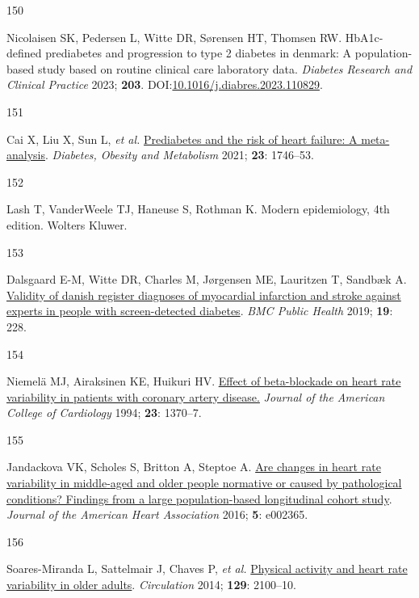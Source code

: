 \documentclass[
  a4paper,
  headsepline=true,
  open=left]{scrbook}
\newlength{\cslhangindent}
\newlength{\csllabelwidth}
\newlength{\cslentryspacingunit} %
\newenvironment{CSLReferences}[2] %
 {%
  \setlength{\parindent}{0pt}
  \ifodd #1
  \let\oldpar\par
  \def\par{\hangindent=\cslhangindent\oldpar}
  \fi
  \setlength{\parskip}{#2\cslentryspacingunit}
 }%
 {}
\newcommand{\CSLLeftMargin}[1]{\parbox[t]{\csllabelwidth}{#1}}
\newcommand{\CSLRightInline}[1]{\parbox[t]{\linewidth - \csllabelwidth}{#1}\break}
\begin{document}
\begin{CSLReferences}{0}{0}
\leavevmode{}%
\CSLLeftMargin{150 }%
\CSLRightInline{Nicolaisen SK, Pedersen L, Witte DR, Sørensen HT,
Thomsen RW. HbA1c-defined prediabetes and progression to type 2 diabetes
in denmark: A population-based study based on routine clinical care
laboratory data. \emph{Diabetes Research and Clinical Practice} 2023;
\textbf{203}.
DOI:\href{https://doi.org/10.1016/j.diabres.2023.110829}{10.1016/j.diabres.2023.110829}.}

\leavevmode{}%
\CSLLeftMargin{151 }%
\CSLRightInline{Cai X, Liu X, Sun L, \emph{et al.}
\href{https://doi.org/10.1111/dom.14388}{Prediabetes and the risk of
heart failure: A meta-analysis}. \emph{Diabetes, Obesity and Metabolism}
2021; \textbf{23}: 1746--53.}

\leavevmode{}%
\CSLLeftMargin{152 }%
\CSLRightInline{Lash T, VanderWeele TJ, Haneuse S, Rothman K. Modern
epidemiology, 4th edition. Wolters Kluwer.}

\leavevmode{}%
\CSLLeftMargin{153 }%
\CSLRightInline{Dalsgaard E-M, Witte DR, Charles M, Jørgensen ME,
Lauritzen T, Sandbæk A.
\href{https://doi.org/10.1186/s12889-019-6549-z}{Validity of danish
register diagnoses of myocardial infarction and stroke against experts
in people with screen-detected diabetes}. \emph{BMC Public Health} 2019;
\textbf{19}: 228.}

\leavevmode{}%
\CSLLeftMargin{154 }%
\CSLRightInline{Niemelä MJ, Airaksinen KE, Huikuri HV.
\href{https://doi.org/10.1016/0735-1097(94)90379-4}{Effect of
beta-blockade on heart rate variability in patients with coronary artery
disease.} \emph{Journal of the American College of Cardiology} 1994;
\textbf{23}: 1370--7.}

\leavevmode{}%
\CSLLeftMargin{155 }%
\CSLRightInline{Jandackova VK, Scholes S, Britton A, Steptoe A.
\href{https://doi.org/doi:10.1161/JAHA.115.002365}{Are changes in heart
rate variability in middle{-}aged and older people normative or caused
by pathological conditions? Findings from a large population{-}based
longitudinal cohort study}. \emph{Journal of the American Heart
Association} 2016; \textbf{5}: e002365.}

\leavevmode{}%
\CSLLeftMargin{156 }%
\CSLRightInline{Soares-Miranda L, Sattelmair J, Chaves P, \emph{et al.}
\href{https://doi.org/10.1161/CIRCULATIONAHA.113.005361}{Physical
activity and heart rate variability in older adults}. \emph{Circulation}
2014; \textbf{129}: 2100--10.}


\end{CSLReferences}
\end{document}

